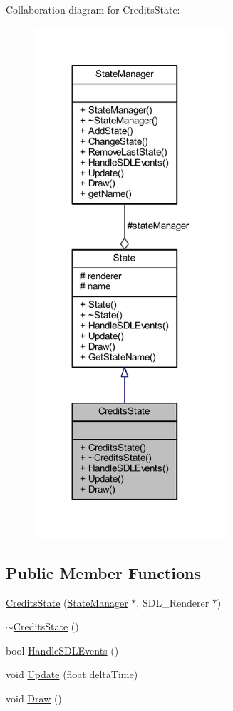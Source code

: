 Collaboration diagram for Credits\+State\+:
\nopagebreak
\begin{figure}[H]
\begin{center}
\leavevmode
\includegraphics[width=203pt]{class_credits_state__coll__graph}
\end{center}
\end{figure}
\subsection*{Public Member Functions}
\begin{DoxyCompactItemize}
\item 
\hyperlink{class_credits_state_a0904712a229318e1b8e43d1c6bb27b7c}{Credits\+State} (\hyperlink{class_state_manager}{State\+Manager} $\ast$, S\+D\+L\+\_\+\+Renderer $\ast$)
\item 
\hyperlink{class_credits_state_abf1cbbd68bbbbf05eae5ab4721f2233a}{$\sim$\+Credits\+State} ()
\item 
bool \hyperlink{class_credits_state_a952d9a50d529f1ba4d883b4a37f558d4}{Handle\+S\+D\+L\+Events} ()
\item 
void \hyperlink{class_credits_state_ab9ad90f4b1c6ddab6ff1234a92c9aec1}{Update} (float delta\+Time)
\item 
void \hyperlink{class_credits_state_a4027aad0c48b505a74faef47470622a1}{Draw} ()
\end{DoxyCompactItemize}
